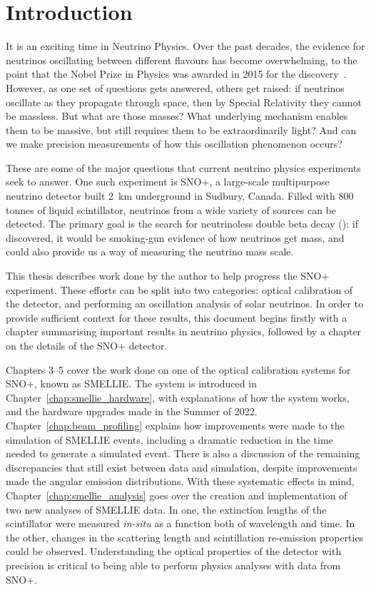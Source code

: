 \chapter*{Introduction}\label{chap:intro}
It is an exciting time in Neutrino Physics. Over the past decades, the evidence for neutrinos oscillating between different flavours has become overwhelming, to the point that the Nobel Prize in Physics was awarded in 2015 for the discovery~\cite{NobelPrizePhysics2015}. However, as one set of questions gets answered, others get raised: if neutrinos oscillate as they propagate through space, then by Special Relativity they cannot be massless. But what are those masses? What underlying mechanism enables them to be massive, but still requires them to be extraordinarily light? And can we make precision measurements of how this oscillation phenomenon occurs?

These are some of the major questions that current neutrino physics experiments seek to answer. One such experiment is SNO+, a large-scale multipurpose neutrino detector built \SI{2}{\km} underground in Sudbury, Canada. Filled with 800 tonnes of liquid scintillator, neutrinos from a wide variety of sources can be detected. The primary goal is the search for neutrinoless double beta decay (\onbb{}): if discovered, it would be smoking-gun evidence of how neutrinos get mass, and could also provide us a way of measuring the neutrino mass scale.

This thesis describes work done by the author to help progress the SNO+ experiment. These efforts can be split into two categories: optical calibration of the detector, and performing an oscillation analysis of solar neutrinos. In order to provide sufficient context for these results, this document begins firstly with a chapter summarising important results in neutrino physics, followed by a chapter on the details of the SNO+ detector.

Chapters 3--5 cover the work done on one of the optical calibration systems for SNO+, known as SMELLIE. The system is introduced in Chapter~\ref{chap:smellie_hardware}, with explanations of how the system works, and the hardware upgrades made in the Summer of 2022. Chapter~\ref{chap:beam_profiling} explains how improvements were made to the simulation of SMELLIE events, including a dramatic reduction in the time needed to generate a simulated event. There is also a discussion of the remaining discrepancies that still exist between data and simulation, despite improvements made the angular emission distributions. With these systematic effects in mind, Chapter~\ref{chap:smellie_analysis} goes over the creation and implementation of two new analyses of SMELLIE data. In one, the extinction lengths of the scintillator were measured \textit{in-situ} as a function both of wavelength and time. In the other, changes in the scattering length and scintillation re-emission properties could be observed. Understanding the optical properties of the detector with precision is critical to being able to perform physics analyses with data from SNO+.

